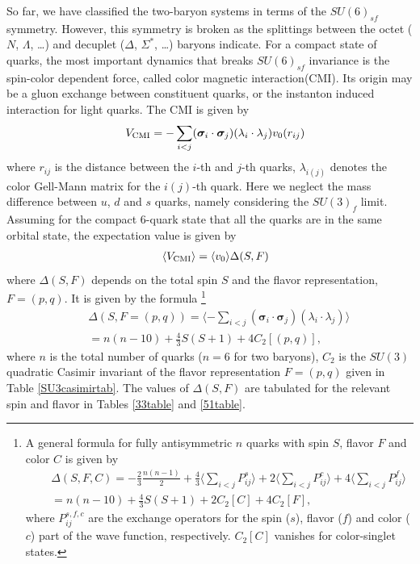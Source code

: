 \documentclass[aps,prd,showpacs,floatfix,reprint,nofootinbib]{revtex4-1}
\begin{document}
So far, we have classified the two-baryon systems in terms of the $SU(6)_{sf}$ symmetry.
However, this symmetry is broken as the splittings 
between the octet ($N$, $\Lambda$, \ldots) and decuplet ($\Delta$, $\Sigma^*$, \ldots) baryons indicate.
For a compact state of quarks, the most important dynamics that breaks $SU(6)_{sf}$ invariance 
is the spin-color dependent force, 
called color magnetic interaction(CMI). Its origin may be a gluon exchange between constituent quarks\cite{DGG}, or the 
instanton induced interaction for light quarks\cite{OT}.
The CMI is given by 
\begin{eqnarray}
&& V_{\rm CMI} =  - \sum_{i<j} ({\bm \sigma}_i\cdot{\bm \sigma}_j) (\lambda_{i}\cdot\lambda_{j}) v_0(r_{ij})
\end{eqnarray}
where $r_{ij}$ is the distance between the $i$-th and $j$-th quarks, $\lambda_{i(j)}$ denotes the color Gell-Mann matrix for the $i(j)$-th quark.
Here we neglect the mass difference between $u$, $d$ and $s$ quarks, namely considering the $SU(3)_f$ limit.
Assuming for the compact 6-quark state that all the quarks are in the same orbital state, the expectation value is given by
\begin{eqnarray}
&& \langle V_{\rm CMI}\rangle =  \langle v_0 \rangle \Delta(S, F)
\label{CMIeq}
\end{eqnarray}
where $\Delta(S,F)$ depends on the total spin $S$ and the flavor representation, $F=(p,q)$. 
It is given by the formula%
\footnote{
A general formula for fully antisymmetric $n$ quarks with spin $S$, flavor $F$ and color $C$ is given by
\begin{eqnarray}
&& \Delta(S,F,C) = -\frac{2}{3}\frac{n(n-1)}{2} +\frac{4}{3} \langle \sum_{i<j}P_{ij}^{s}\rangle
+ 2\langle \sum_{i<j}P_{ij}^{c}\rangle +4\langle \sum_{i<j}P_{ij}^{f}\rangle\nonumber\\
&& = n(n-10) +\frac{4}{3}S(S+1) +  2C_2[C] + 4C_2[F], \nonumber
\end{eqnarray}
where $P_{ij}^{s,f,c}$ are the exchange operators for the spin ($s$), flavor ($f$) and color ($c$) part of the wave function, respectively. $C_2[C]$ vanishes for color-singlet states.}%
\begin{eqnarray}
&& \Delta(S, F=(p,q)) = \langle - \sum_{i<j} ({\bm \sigma}_i\cdot{\bm \sigma}_j) (\lambda_{i}\cdot\lambda_{j})\rangle\nonumber\\
&& = n(n-10) +\frac{4}{3}S(S+1) +  4C_2[(p,q)],
\label{MSF}
\end{eqnarray}
where $n$ is the total number of quarks ($n=6$ for two baryons), 
$C_2$ is the $SU(3)$ quadratic Casimir invariant of the flavor representation $F=(p,q)$ given in Table \ref{SU3casimirtab}.
The values of $\Delta(S,F)$ are tabulated for the relevant spin and flavor in Tables \ref{33table} and \ref{51table}.%
\end{document}
